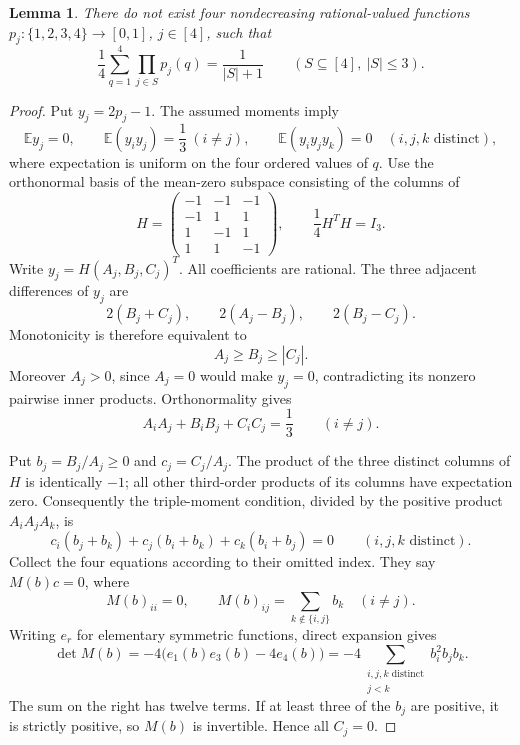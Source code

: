 \documentclass[11pt]{article}
\newtheorem{lemma}[theorem]{Lemma}
\begin{document}
\begin{lemma}\label{lem:local}
There do not exist four nondecreasing rational-valued functions
$p_j:\{1,2,3,4\}\to[0,1]$, $j\in[4]$, such that
\[
 \frac14\sum_{q=1}^4\prod_{j\in S}p_j(q)=\frac1{|S|+1}
 \qquad(S\subseteq[4],\ |S|\leq3).
\]
\end{lemma}
\begin{proof}
Put $y_j=2p_j-1$. The assumed moments imply
\[
 \mathbb E y_j=0,\qquad
 \mathbb E(y_i y_j)=\frac13\ (i\ne j),\qquad
 \mathbb E(y_i y_j y_k)=0\quad(i,j,k\text{ distinct}),
\]
where expectation is uniform on the four ordered values of $q$.
Use the orthonormal basis of the mean-zero subspace consisting of the
columns of
\[
 H=\begin{pmatrix}
 -1&-1&-1\\
 -1& 1& 1\\
  1&-1& 1\\
  1& 1&-1
 \end{pmatrix},
 \qquad \frac14H^TH=I_3.
\]
Write $y_j=H(A_j,B_j,C_j)^T$. All coefficients are rational.
The three adjacent differences of $y_j$ are
\[
 2(B_j+C_j),\qquad2(A_j-B_j),\qquad2(B_j-C_j).
\]
Monotonicity is therefore equivalent to
\begin{equation}\label{eq:cone}
 A_j\geq B_j\geq|C_j|.
\end{equation}
Moreover $A_j>0$, since $A_j=0$ would make $y_j=0$, contradicting
its nonzero pairwise inner products. Orthonormality gives
\begin{equation}\label{eq:pair}
 A_iA_j+B_iB_j+C_iC_j=\frac13\qquad(i\ne j).
\end{equation}

Put $b_j=B_j/A_j\geq0$ and $c_j=C_j/A_j$.
The product of the three distinct columns of $H$ is identically $-1$;
all other third-order products of its columns have expectation zero.
Consequently the triple-moment condition, divided by the positive product
$A_iA_jA_k$, is
\[
 c_i(b_j+b_k)+c_j(b_i+b_k)+c_k(b_i+b_j)=0
 \qquad(i,j,k\text{ distinct}).
\]
Collect the four equations according to their omitted index. They say
$M(b)c=0$, where
\[
 M(b)_{ii}=0,\qquad
 M(b)_{ij}=\sum_{k\notin\{i,j\}}b_k\quad(i\ne j).
\]
Writing $e_r$ for elementary symmetric functions, direct expansion gives
\begin{equation}\label{eq:det}
 \det M(b)=-4\bigl(e_1(b)e_3(b)-4e_4(b)\bigr)
 =-4\sum_{\substack{i,j,k\text{ distinct}\\j<k}}b_i^2b_jb_k.
\end{equation}
The sum on the right has twelve terms. If at least three of the $b_j$
are positive, it is strictly positive, so $M(b)$ is invertible. Hence
all $C_j=0$.


\end{proof}
\end{document}
